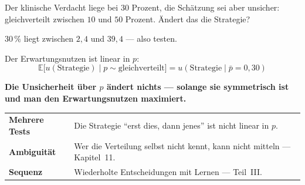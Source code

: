\begin{aufgabe}
Der klinische Verdacht liege bei $30$ Prozent, die Schätzung sei aber unsicher: gleichverteilt zwischen $10$ und $50$ Prozent. Ändert das die Strategie?

\loesung
{}
$30\,\%$ liegt zwischen $2{,}4$ und $39{,}4$ --- also testen.

Der Erwartungsnutzen ist linear in $p$:
\[ \mathbb{E}\bigl[u(\text{Strategie}) \mid p \sim \text{gleichverteilt}\bigr] = u(\text{Strategie} \mid \bar p = 0{,}30) \]

\begin{center}
\begin{minipage}{0.9\textwidth}
\textbf{Die Unsicherheit über $p$ ändert nichts --- solange sie symmetrisch ist und man den Erwartungsnutzen maximiert.}
\end{minipage}
\end{center}

\begin{center}
\begin{minipage}{0.88\textwidth}
\end{minipage}
\end{center}

\begin{center}
{\small
\renewcommand{\arraystretch}{1.5}
\begin{tabular}{@{}P{2.8cm}P{5.8cm}@{}}
\toprule
\textbf{Mehrere Tests} & Die Strategie \enquote{erst dies, dann jenes} ist nicht linear in $p$.\\
\textbf{Ambiguität} & Wer die Verteilung selbst nicht kennt, kann nicht mitteln --- Kapitel~11.\\
\textbf{Sequenz} & Wiederholte Entscheidungen mit Lernen --- Teil~III.\\
\bottomrule
\end{tabular}}
\end{center}
\end{aufgabe}


